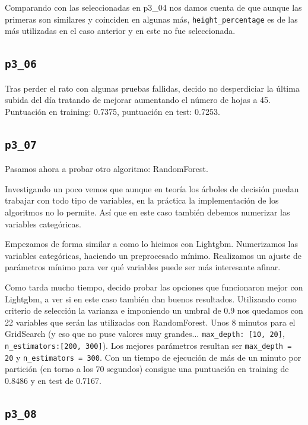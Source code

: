\documentclass[a4paper, 20pt]{article}
\begin{document}
Comparando con las seleccionadas en p3\_04 nos damos cuenta de que aunque las primeras son similares y coinciden en algunas más, \texttt{height\_percentage} es de las más utilizadas en el caso anterior y en este no fue seleccionada.

\subsection{\texttt{p3\_06}}
Tras perder el rato con algunas pruebas fallidas, decido no desperdiciar la última subida del día tratando de mejorar aumentando el número de hojas a 45. Puntuación en training: 0.7375, puntuación en test: 0.7253.

\subsection{\texttt{p3\_07}}

Pasamos ahora a probar otro algoritmo: RandomForest.

Investigando un poco vemos que aunque en teoría los árboles de decisión puedan trabajar con todo tipo de variables, en la práctica la implementación de los algoritmos no lo permite. Así que en este caso también debemos numerizar las variables categóricas.

Empezamos de forma similar a como lo hicimos con Lightgbm. Numerizamos las variables categóricas, haciendo un preprocesado mínimo. Realizamos un ajuste de parámetros mínimo para ver qué variables puede ser más interesante afinar.

Como tarda mucho tiempo, decido probar las opciones que funcionaron mejor con Lightgbm, a ver si en este caso también dan buenos resultados. Utilizando como criterio de selección la varianza e imponiendo un umbral de 0.9 nos quedamos con 22 variables que serán las utilizadas con RandomForest. Unos 8 minutos para el GridSearch (y eso que no puse valores muy grandes... \texttt{max\_depth: [10, 20]}, \texttt{n\_estimators:[200, 300]}). Los mejores parámetros resultan ser \texttt{max\_depth = 20} y \texttt{n\_estimators = 300}.
Con un tiempo de ejecución de más de un minuto por partición (en torno a los 70 segundos) consigue una puntuación en training de 0.8486 y en test de 0.7167.

\subsection{\texttt{p3\_08}}
\end{document}
